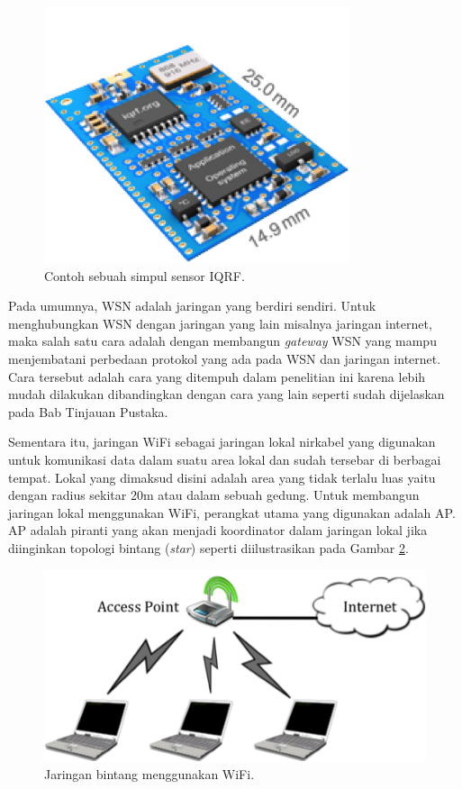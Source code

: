       \begin{figure}[H]
        \centering
          \includegraphics{gambar/iqrf}
          \caption{Contoh sebuah simpul sensor IQRF.}
          \label{iqrf}
      \end{figure}

    Pada umumnya, WSN adalah jaringan yang berdiri sendiri. Untuk menghubungkan WSN dengan jaringan yang lain misalnya jaringan internet, maka salah satu cara adalah dengan membangun \emph{gateway} WSN yang mampu menjembatani perbedaan protokol yang ada pada WSN dan jaringan internet. Cara tersebut adalah cara yang ditempuh dalam penelitian ini karena lebih mudah dilakukan dibandingkan dengan cara yang lain seperti sudah dijelaskan pada Bab Tinjauan Pustaka.

    Sementara itu, jaringan WiFi sebagai jaringan lokal nirkabel yang digunakan untuk komunikasi data dalam suatu area lokal dan sudah tersebar di berbagai tempat. Lokal yang dimaksud disini adalah area yang tidak terlalu luas yaitu dengan radius sekitar 20m atau dalam sebuah gedung. Untuk membangun jaringan lokal menggunakan WiFi, perangkat utama yang digunakan adalah AP. AP adalah piranti yang akan menjadi koordinator dalam jaringan lokal jika diinginkan topologi bintang (\emph{star}) seperti diilustrasikan pada Gambar \ref{star}.

      \begin{figure}[ht!]
        \centering
          \includegraphics{gambar/star}
          \caption{Jaringan bintang menggunakan WiFi.}
          \label{star}
      \end{figure}

